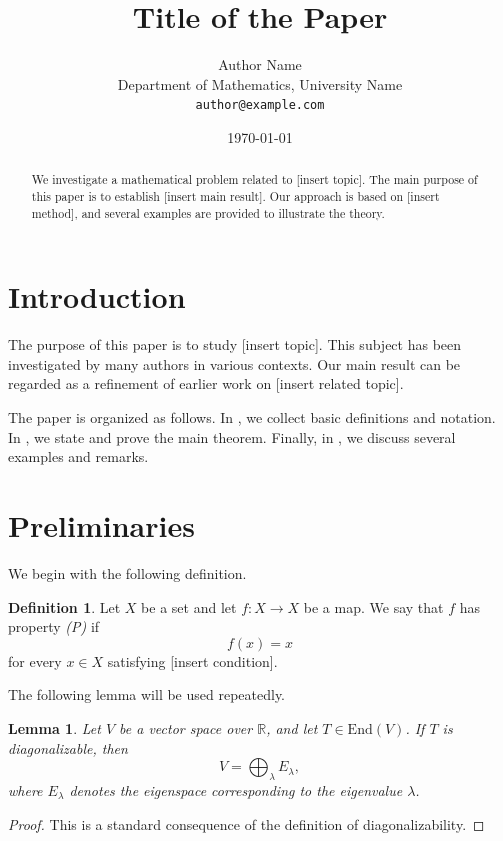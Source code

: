 \documentclass[11pt,a4paper]{article}
\title{\textbf{Title of the Paper}}
\author{
  Author Name\\
  \small Department of Mathematics, University Name\\
  \small \texttt{author@example.com}
}
\date{\today}
\theoremstyle{plain}
\newtheorem{lemma}[theorem]{Lemma}
\theoremstyle{definition}
\newtheorem{definition}[theorem]{Definition}
\newcommand{\R}{\mathbb{R}}
\newcommand{\End}{\mathrm{End}}
\begin{document}
\maketitle

\begin{abstract}
We investigate a mathematical problem related to [insert topic].
The main purpose of this paper is to establish [insert main result].
Our approach is based on [insert method], and several examples are provided
to illustrate the theory.
\end{abstract}

\section{Introduction}

The purpose of this paper is to study [insert topic].
This subject has been investigated by many authors in various contexts.
Our main result can be regarded as a refinement of earlier work on
[insert related topic].

The paper is organized as follows.
In , we collect basic definitions and notation.
In , we state and prove the main theorem.
Finally, in , we discuss several examples and remarks.

\section{Preliminaries}\label{sec:preliminaries}

We begin with the following definition.

\begin{definition}
Let $X$ be a set and let $f : X \to X$ be a map.
We say that $f$ has property \emph{(P)} if
\[
  f(x) = x
\]
for every $x \in X$ satisfying [insert condition].
\end{definition}

The following lemma will be used repeatedly.

\begin{lemma}\label{lem:basic}
Let $V$ be a vector space over $\R$, and let $T \in \End(V)$.
If $T$ is diagonalizable, then
\[
  V = \bigoplus_{\lambda} E_{\lambda},
\]
where $E_{\lambda}$ denotes the eigenspace corresponding to the eigenvalue $\lambda$.
\end{lemma}

\begin{proof}
This is a standard consequence of the definition of diagonalizability.
\end{proof}
\end{document}
